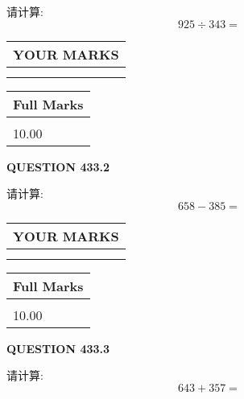 \documentclass{ctexart}
\begin{document}
  
 
请计算:
\begin{equation}
925  \div    %
343 = \nonumber
\end{equation}
 

 

 
  
\vspace{0.2in}
  
\noindent\begin{tabular}{|l|}
\hline
 YOUR MARKS  \\
\hline
 \\ 
 \\ 
\hline
\end{tabular}
\hspace{0.05in} \begin{tabular}{|l|}
\hline
 Full Marks  \\
\hline
 \\ 
10.00 \\
\hline
\end{tabular}
{\textbf{\Large{QUESTION
433.2 
}}}
  
  
 
请计算:
\begin{equation}
658 -   %
385 = \nonumber
\end{equation}
 

 

 
  
\vspace{0.2in}
  
\noindent\begin{tabular}{|l|}
\hline
 YOUR MARKS  \\
\hline
 \\ 
 \\ 
\hline
\end{tabular}
\hspace{0.05in} \begin{tabular}{|l|}
\hline
 Full Marks  \\
\hline
 \\ 
10.00 \\
\hline
\end{tabular}
{\textbf{\Large{QUESTION
433.3 
}}}
  
  
 
请计算:
\begin{equation}
643 +  %
357 = \nonumber
\end{equation}
 

 

 
  
\vspace{0.2in}
  
\end{document}
